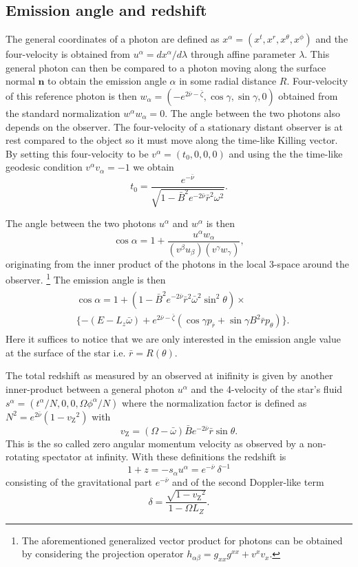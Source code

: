\documentclass[iop, usenatbib]{emulateapj}
\newcommand{\be}{\begin{equation}}
\newcommand{\ee}{\end{equation}}
\renewcommand{\vec}[1]{\ensuremath{\boldsymbol{#1}}​}
\newcommand{\Ca}{\ensuremath{\mathcal{C}}}
\newcommand{\rb}{\ensuremath{\bar{r}}}
\newcommand{\wb}{\ensuremath{\bar{\omega}}}
\newcommand{\nub}{\ensuremath{\bar{\nu}}}
\newcommand{\zetab}{\ensuremath{\bar{\zeta}}}
\newcommand{\Bb}{\ensuremath{\bar{B}}}
\newcommand{\vz}{\ensuremath{v_{\mathrm{Z}}}}
\begin{document}
\subsection{Emission angle and redshift}
The general coordinates of a photon are defined as $x^{\alpha} = (x^{t}, x^{r}, x^{\theta}, x^{\phi})$ and the four-velocity is obtained from $u^{\alpha} = dx^{\alpha}/d\lambda$ through affine parameter $\lambda$.
This general photon can then be compared to a photon moving along the surface normal $\vec{n}$ to obtain the emission angle $\alpha$ in some radial distance $R$.
Four-velocity of this reference photon is then $w_{\alpha} = (-e^{2\nub-\zetab}, \cos\gamma, \sin\gamma, 0 )$ obtained from the standard normalization $w^{\alpha}w_{\alpha} = 0$.
The angle between the two photons also depends on the observer.
The four-velocity of a stationary distant observer is at rest compared to the object so it must move along the time-like Killing vector.
By setting this four-velocity to be $v^{\alpha}=(t_0,0,0,0)$ and using the the time-like geodesic condition $v^{\alpha} v_{\alpha} = -1$ we obtain 
\be
t_0 = \frac{e^{-\nub}}{\sqrt{1 - \Bb^2 e^{-2\nub} \rb^2 \omega^2}}.
\ee

The angle between the two photons $u^{\alpha}$ and $w^{\alpha}$ is then \citep{PFC83}
\be
\cos \alpha = 1 + \frac{u^{\alpha}w_{\alpha}}{(v^{\beta} u_{\beta})(v^{\gamma} w_{\gamma})},
\ee
originating from the inner product of the photons in the local 3-space around the observer.%
\footnote{
The aforementioned generalized vector product for photons can be obtained by considering the projection operator $h_{\alpha \beta} = g_{xx}g^{xx} + v^xv_x$.
}
The emission angle is then
\begin{align}\begin{split}
&\cos \alpha = 1 + (1-\Bb^2 e^{-2\nub} \rb^2\wb^2\sin^2\theta) \times \\
&\{ -(E-L_z \wb) + e^{2\nub-\zetab} (\cos\gamma p_{\rb} + \sin\gamma B^2 \rb p_{\theta}) \}.
\end{split}\end{align}
Here it suffices to notice that we are only interested in the emission angle value at the surface of the star i.e. $\rb = R(\theta)$.


The total redshift as measured by an observed at inifinity is given by another inner-product between a general photon $u^{\alpha}$ and the 4-velocity of the star's fluid $s^{\alpha} = (t^{\alpha}/N,0,0,\Omega \phi^{\alpha}/N)$ where the normalization factor is defined as $N^2 = e^{2\nub} (1 - \vz^2)$ with
\be
\vz = (\Omega - \wb) \Bb e^{-2\nub} \rb \sin\theta.
\ee
This is the so called zero angular momentum velocity as observed by a non-rotating spectator at infinity.
With these definitions the redshift is
\be
1 + z = -s_{\alpha} u^{\alpha} = e^{-\nub} ~\delta^{-1}
\ee
consisting of the gravitational part $e^{-\nub}$ and of the second Doppler-like term
\be
\delta = \frac{\sqrt{1-\vz^2}}{1 - \Omega L_Z}.
\ee
\end{document}
